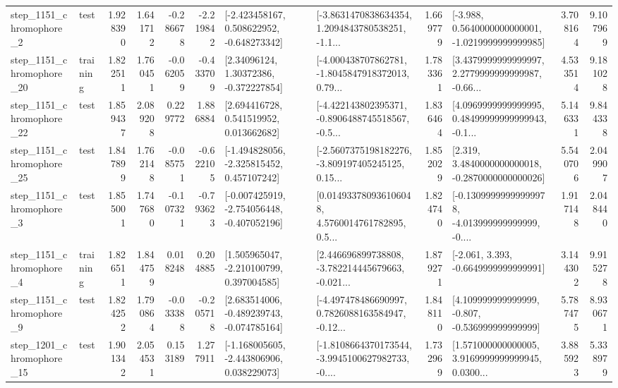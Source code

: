 \begin{tabular}{llrrrrllrlrr}
  step\_1151\_chromophore\_2 &      test &      1.928390 &    1.641712 &     -0.286678 & -2.219842 &   [-2.423458167, 0.508622952, -0.648273342] &  [-3.8631470838634354, 1.2094843780538251, -1.1... &       1.669779 &  [-3.988, 0.5640000000000001, -1.0219999999999985] &            3.708164 &          9.107969 \\
 step\_1151\_chromophore\_20 &  training &      1.822511 &    1.760451 &     -0.062059 & -0.433709 &      [2.34096124, 1.30372386, -0.372227854] &  [-4.000438707862781, -1.8045847918372013, 0.79... &       1.783361 &  [3.4379999999999997, 2.2779999999999987, -0.66... &            4.533514 &          9.181028 \\
 step\_1151\_chromophore\_22 &      test &      1.859437 &    2.089208 &      0.229772 &  1.886884 &     [2.694416728, 0.541519952, 0.013662682] &  [-4.422143802395371, -0.8906488745518567, -0.5... &       1.836464 &  [4.0969999999999995, 0.48499999999999943, -0.1... &            5.146331 &          9.844338 \\
 step\_1151\_chromophore\_25 &      test &      1.847899 &    1.762148 &     -0.085751 & -0.622105 &   [-1.494828056, -2.325815452, 0.457107242] &  [-2.5607375198182276, -3.809197405245125, 0.15... &       1.852029 &   [2.319, 3.4840000000000018, -0.2870000000000026] &            5.540706 &          2.049907 \\
  step\_1151\_chromophore\_3 &      test &      1.855001 &    1.747680 &     -0.107321 & -0.793623 &  [-0.007425919, -2.754056448, -0.407052196] &  [0.014933780936106048, 4.5760014761782895, 0.5... &       1.824740 &  [-0.13099999999999978, -4.013999999999999, -0.... &            1.917148 &          2.048440 \\
  step\_1151\_chromophore\_4 &  training &      1.826511 &    1.844759 &      0.018248 &  0.204885 &    [1.505965047, -2.210100799, 0.397004585] &  [2.446696899738808, -3.782214445679663, -0.021... &       1.879271 &               [-2.061, 3.393, -0.6649999999999991] &            3.144302 &          9.915278 \\
  step\_1151\_chromophore\_9 &      test &      1.824252 &    1.790864 &     -0.033388 & -0.205718 &   [2.683514006, -0.489239743, -0.074785164] &  [-4.497478486690997, 0.7826088163584947, -0.12... &       1.848110 &    [4.109999999999999, -0.807, -0.536999999999999] &            5.787475 &          8.930671 \\
 step\_1201\_chromophore\_15 &      test &      1.901342 &    2.054531 &      0.153189 &  1.277911 &   [-1.168005605, -2.443806906, 0.038229073] &  [-1.8108664370173544, -3.9945100627982733, -0.... &       1.732969 &  [1.571000000000005, 3.9169999999999945, 0.0300... &            3.885923 &          5.338979 \\

\end{tabular}

